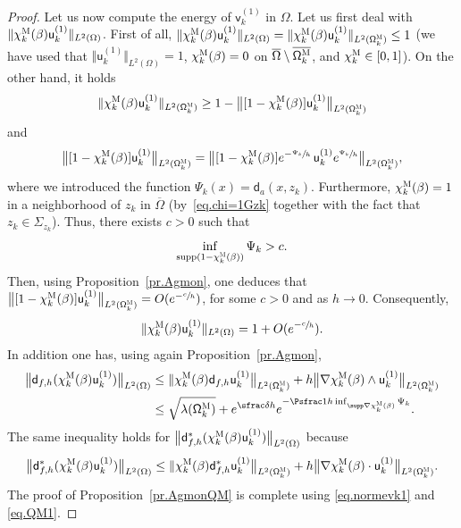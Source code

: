 \begin{proof}
Let us now compute the energy of $\mathsf v_k^{(1)}$ in $\Omega$.
Let us first deal with $\Vert \chi_k^{\textsc{M}} (\beta)\mathsf u_k^{(1)}\Vert _{ L^2 (\Omega) }$. First of all, $\Vert \chi_k^{\textsc{M}} (\beta)\mathsf u_k^{(1)}\Vert _{ L^2 (\Omega) }=\Vert \chi_k^{\textsc{M}} (\beta)\mathsf u_k^{(1)}\Vert _{ L^2 (\mathsf \Omega^{\textsc{M}}_k) }\le 1$ (we have used that $\Vert \mathsf u_k^{(1)}\Vert _{ L^2 (\Omega) }= 1$, $\chi_k^{\textsc{M}} (\beta)=0$ on $\overline{\Omega}\setminus \overline{ \mathsf \Omega_k^{\textsc{M}}}$, and $\chi_k^{\textsc{M}}\in [0,1]$).
On the other hand, it holds
\[
\Vert \chi_k^{\textsc{M}} (\beta)\mathsf u_k^{(1)}\Vert _{ L^2 (\mathsf \Omega_k^{\textsc{M}}) } \ge 1- \big \Vert [1-\chi_k^{\textsc{M}} (\beta)]\mathsf u_k^{(1)}\big \Vert _{ L^2 (\mathsf \Omega_k^{\textsc{M}}) }
\]
and
\[
\big \Vert [1-\chi_k^{\textsc{M}} (\beta)]\mathsf u_k^{(1)}\big
\Vert _{ L^2 (\mathsf \Omega_k^{\textsc{M}}) } = \big \Vert
[1-\chi_k^{\textsc{M}} (\beta)]e^{-\sfrac{\Psi_k}{h}}\, \mathsf
u_k^{(1)}e^{\sfrac{\Psi_k}{h}}\big \Vert _{ L^2 (\mathsf
\Omega_k^{\textsc{M}}) },
\]
where we introduced the function $\Psi_k(x)=\mathsf d_a(x,z_k)$.
Furthermore, $\chi_k^{\textsc{M}} (\beta)=1$ in a neighborhood of $z_k$ in $\overline \Omega$ (by~\eqref{eq.chi=1Gzk} together with the fact that $z_k\in \Sigma_{z_k}$). Thus, there exists $c>0$ such that
\[
\inf_{\text{supp}(1-\chi_k^{\textsc{M}} (\beta))} \Psi_k>c.
\]
Then, using Proposition~\ref{pr.Agmon}, one deduces that $\big \Vert [1-\chi_k^{\textsc{M}} (\beta)]\mathsf u_k^{(1)}\big \Vert _{ L^2 (\mathsf \Omega_k^{\textsc{M}}) }=O(e^{-\sfrac ch})$, for some $c>0$ and as $h\to 0$. Consequently,
\begin{align}\label{eq.normevk1}
\Vert \chi_k^{\textsc{M}} (\beta)\mathsf u_k^{(1)}\Vert _{ L^2 (\Omega) }=1+O(e^{-\sfrac ch}).
\end{align}
In addition one has, using again Proposition~\ref{pr.Agmon},
\begin{align*}
\big \| \mathsf d_{f,h} (\chi_k^{\textsc{M}} (\beta)\mathsf u_k^{(1)}) \big \|_{ L^{2} (\Omega)}&\le \| \chi_k^{\textsc{M}} (\beta) \mathsf d_{f,h} \mathsf u_k^{(1)} \big \|_{ L^{2} (\mathsf \Omega_k^{\textsc{M}})} + h \big \| \nabla \chi_k^{\textsc{M}} (\beta)\wedge \mathsf u_k^{(1)} \big \|_{ L^{2} (\mathsf \Omega_k^{\textsc{M}})}\\
&\le \sqrt {\lambda(\mathsf \Omega_k^{\textsc{M}})}+ e^{\sfrac \delta h} e^{-\Psfrac 1h \inf_{\supp \nabla \chi_k^{\textsc{M}} (\beta)} \Psi_k}.
\end{align*}
The same inequality holds for $\big \| \mathsf d^*_{f,h} (\chi_k^{\textsc{M}} (\beta)\mathsf u_k^{(1)}) \big \|_{ L^{2} (\Omega)}$ because
\[
\big \| \mathsf d^*_{f,h} (\chi_k^{\textsc{M}} (\beta)\mathsf u_k^{(1)}) \big \|_{ L^{2} (\Omega)}\le \| \chi_k^{\textsc{M}} (\beta) \mathsf d^*_{f,h} \mathsf u_k^{(1)} \big \|_{ L^{2} (\mathsf \Omega_k^{\textsc{M}})} + h \big \| \nabla \chi_k^{\textsc{M}} (\beta)\cdot\mathsf u_k^{(1)} \big \|_{ L^{2} (\mathsf \Omega_k^{\textsc{M}})}.
\]
The proof of Proposition~\ref{pr.AgmonQM} is complete using \eqref{eq.normevk1} and \eqref{eq.QM1}.
\end{proof}

